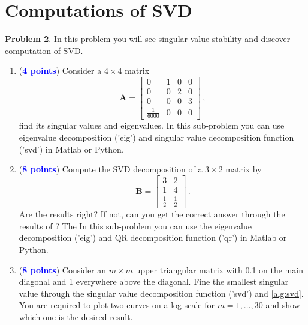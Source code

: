 \documentclass[english,onecolumn]{IEEEtran}
\begin{document}
\section{Computations of SVD}
\noindent\textbf{Problem 2}.
In this problem you will see singular value stability and discover computation of SVD.
\begin{enumerate}
    \item (\textcolor{blue}{\textbf{4 points}}) Consider a $4 \times 4$ matrix
    \[
	\mathbf{A} = \begin{bmatrix}
		0& 1&0&0 \\
		0&0&2&0\\
		0&0&0&3\\
		\frac{1}{6000}&0&0&0
	\end{bmatrix}\,,
	\]
	find its singular values and eigenvalues. In this sub-problem you can use eigenvalue decomposition ('eig') and singular value decomposition function ('svd') in Matlab or Python.
	\item (\textcolor{blue}{\textbf{8 points}}) Compute the SVD decomposition of a $3 \times 2$ matrix by 
	\[
	\mathbf{B} = \begin{bmatrix}
		3& 2 \\
		1&4  \\
		\frac{1}{2}&\frac{1}{2}
	\end{bmatrix}\,.
	\]
Are the results right? If not, can you get the correct answer through the results of ? The In this sub-problem you can use the eigenvalue decomposition ('eig') and QR decomposition function ('qr') in Matlab or Python.
\item (\textcolor{blue}{\textbf{8 points}}) Consider an $m\times m$ upper triangular matrix with 0.1 on the main diagonal and 1 everywhere above the diagonal. Fine the smallest singular value through the singular value decomposition function ('svd') and \cref{alg:svd}. You are required to plot two curves on a log scale for $m=1,\dots,30$ and show which one is the desired result.
\end{enumerate}
\end{document}
